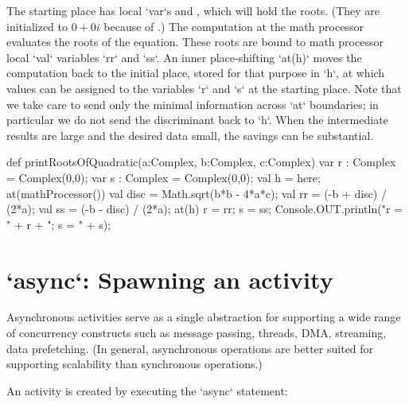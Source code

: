 The starting place has local \xcd`var`s  and , which will hold
the roots.  (They are initialized to {$0+0i$} because of
.) 
The computation at the math processor evaluates the roots of the equation.
These roots are bound to math processor local \xcd`val` variables \xcd`rr` and
\xcd`ss`.  An inner place-shifting \xcd`at(h)` moves the computation back to
the initial place, stored for that purpose in \xcd`h`, at which values can be
assigned to the variables \xcd`r` 
and \xcd`s` at the starting place.  Note that we take care to send only the
minimal information across \xcd`at` boundaries; in particular we do not 
send the discriminant back to \xcd`h`.  When the intermediate results are
large and the desired data small, the savings can be substantial.

\begin{xten}
def printRootsOfQuadratic(a:Complex, b:Complex, c:Complex) {
  var r : Complex = Complex(0,0);
  var s : Complex = Complex(0,0);
  val h = here;
  at(mathProcessor()) {
    val disc = Math.sqrt(b*b - 4*a*c);
    val rr = (-b + disc) / (2*a);
    val ss = (-b - disc) / (2*a);
    at(h) {
      r = rr; s = ss;
    }
  }
  Console.OUT.println("r = " + r + "; s = " + s);
}
\end{xten}
\section{\xcd`async`: Spawning an activity}\label{AsynchronousActivity}\label{AsyncActivity}

Asynchronous activities serve as a single abstraction for supporting a
wide range of concurrency constructs such as message passing, threads,
DMA, streaming, data prefetching. (In general, asynchronous operations
are better suited for supporting scalability than synchronous
operations.)

An activity is created by executing the \xcd`async` statement: 



